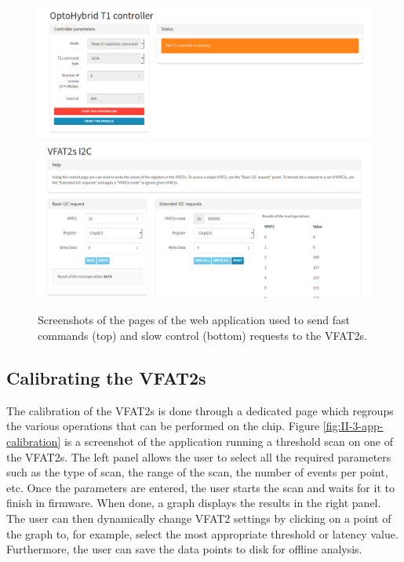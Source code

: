       \begin{figure}[h!]
        \centering
        \includegraphics[width=\textwidth]{img/II-3-test-beam/app-t1.png} \\
        \includegraphics[width=\textwidth]{img/II-3-test-beam/app-i2c.png}
        \caption{Screenshots of the pages of the web application used to send fast commands (top) and slow control (bottom) requests to the VFAT2s.}
        \label{fig:II-3-app-control}
      \end{figure}

    \subsection{Calibrating the VFAT2s}

      The calibration of the VFAT2s is done through a dedicated page which regroups the various operations that can be performed on the chip. Figure \ref{fig:II-3-app-calibration} is a screenshot of the application running a threshold scan on one of the VFAT2s. The left panel allows the user to select all the required parameters such as the type of scan, the range of the scan, the number of events per point, etc. Once the parameters are entered, the user starts the scan and waits for it to finish in firmware. When done, a graph displays the results in the right panel. The user can then dynamically change VFAT2 settings by clicking on a point of the graph to, for example, select the most appropriate threshold or latency value. Furthermore, the user can save the data points to disk for offline analysis.

